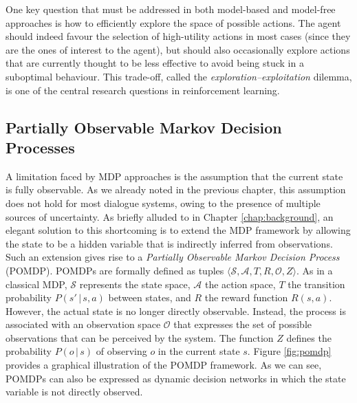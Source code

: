   
One key question that must be addressed in both model-based and model-free approaches is how  to efficiently explore the space of possible actions.  The agent should indeed favour the selection of high-utility actions in most cases (since they are the ones of interest to the agent), but should also occasionally explore actions that are currently thought to be less effective to avoid being stuck in a suboptimal behaviour. This trade-off, called the \textit{exploration--exploitation} dilemma, is one of the central research questions in reinforcement learning. 


\subsection{Partially Observable Markov Decision Processes}
\label{sec:pomdp}

A limitation faced by MDP approaches is the assumption that the current state is fully observable. As we already noted in the previous chapter, this assumption does not hold for most dialogue systems, owing to the presence of multiple sources of uncertainty.  As briefly alluded to in Chapter \ref{chap:background}, an elegant solution to this shortcoming is to extend the MDP framework by allowing the state to be a hidden variable that is indirectly inferred from observations.  Such an extension gives rise to a  \textit{Partially Observable Markov Decision Process} (POMDP).  POMDPs are formally defined as tuples $\langle \mathcal{S}, \mathcal{A}, T, R, \mathcal{O}, Z \rangle$.  As in a classical MDP, $\mathcal{S}$ represents the state space, $\mathcal{A}$ the action space, $T$ the transition probability $P(s'\, | \, s,a)$ between states, and $R$ the reward function $R(s,a)$.  However, the actual state is no longer directly observable.  Instead, the process is associated with an observation space $\mathcal{O}$ that expresses the set of possible observations that can be perceived by the system. The function $Z$  defines the probability $P(o\, |\, s)$ of observing $o$ in the current state $s$.  Figure \ref{fig:pomdp} provides a graphical illustration of the POMDP framework.  As we can see, POMDPs can also be expressed as dynamic decision networks in which the state variable is not directly observed. 

